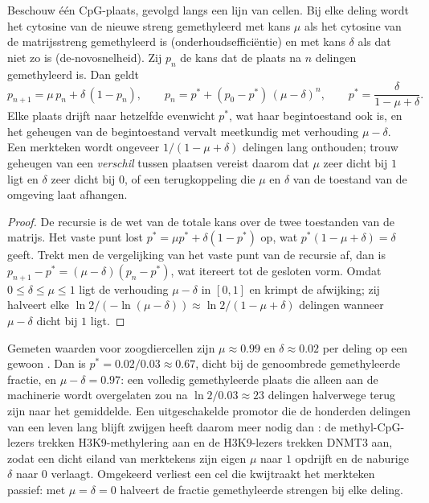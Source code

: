 \begin{theorem}\label{thm:b3:chromatin-epigenetics:maintenance}
Beschouw één CpG-plaats, gevolgd langs een lijn van cellen. Bij elke
deling wordt het cytosine van de nieuwe streng gemethyleerd met kans
$\mu$ als het cytosine van de matrijsstreng gemethyleerd is
(onderhoudsefficiëntie) en met kans $\delta$ als dat niet zo is
(de-novosnelheid). Zij $p_{n}$ de kans dat de plaats na $n$ delingen
gemethyleerd is. Dan geldt
\[
p_{n+1} = \mu\, p_{n} + \delta\,(1 - p_{n}),
\qquad
p_{n} = p^{*} + (p_{0} - p^{*})\,(\mu - \delta)^{n},
\qquad
p^{*} = \frac{\delta}{1 - \mu + \delta}.
\]
Elke plaats drijft naar hetzelfde evenwicht $p^{*}$, wat haar
begintoestand ook is, en het geheugen van de begintoestand vervalt
meetkundig met verhouding $\mu - \delta$. Een merkteken wordt ongeveer
$1/(1 - \mu + \delta)$ delingen lang onthouden; trouw geheugen van een
\emph{verschil} tussen plaatsen vereist daarom dat $\mu$ zeer dicht bij
$1$ ligt en $\delta$ zeer dicht bij $0$, of een terugkoppeling die
$\mu$ en $\delta$ van de toestand van de omgeving laat afhangen.
\end{theorem}
\begin{proof}
De recursie is de wet van de totale kans over de twee toestanden van
de matrijs. Het vaste punt lost $p^{*} = \mu p^{*} + \delta(1 -
p^{*})$ op, wat $p^{*}(1 - \mu + \delta) = \delta$ geeft. Trekt men de
vergelijking van het vaste punt van de recursie af, dan is
$p_{n+1} - p^{*} = (\mu -
\delta)(p_{n} - p^{*})$, wat itereert tot de gesloten vorm. Omdat
$0 \le \delta \le \mu \le 1$ ligt de verhouding $\mu - \delta$ in $[0,1]$
en krimpt de afwijking; zij halveert elke $\ln 2 / (-\ln(\mu -
\delta)) \approx \ln 2/(1 - \mu + \delta)$ delingen wanneer $\mu -
\delta$ dicht bij $1$ ligt.
\end{proof}

\begin{example}[Getallen]\label{ex:b3:chromatin-epigenetics:maintenance-numbers}
Gemeten waarden voor zoogdiercellen zijn $\mu \approx 0.99$ en
$\delta \approx 0.02$ per deling op een gewoon . Dan is $p^{*} =
0.02/0.03 \approx 0.67$, dicht bij de genoombrede gemethyleerde
fractie, en $\mu - \delta = 0.97$: een volledig gemethyleerde plaats
die alleen aan de machinerie wordt overgelaten zou na $\ln 2 /
0.03 \approx 23$ delingen halverwege terug zijn naar het gemiddelde.
Een uitgeschakelde promotor die de honderden delingen van een leven
lang blijft zwijgen heeft daarom meer nodig dan : de
methyl-CpG-lezers trekken H3K9-methylering aan en de H3K9-lezers
trekken DNMT3 aan, zodat een dicht eiland van merktekens zijn eigen
$\mu$ naar $1$ opdrijft en de naburige $\delta$ naar $0$ verlaagt.
Omgekeerd verliest een cel die  kwijtraakt het merkteken passief:
met $\mu = \delta = 0$ halveert de fractie gemethyleerde strengen bij
elke deling.
\end{example}

